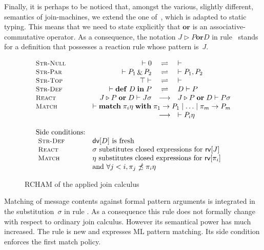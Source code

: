 \documentclass{LMCS}
\newcommand{\pt}{\pi}
\newcommand{\rln}[1]{\text{\small\sc #1}}
\newcommand{\kwd}[1]{\ensuremath{\mathbf{#1}}}
\newcommand{\prefix}[1]{\mathopen{}\mathrel{\kwd {#1}}}
\newcommand{\infix}[1]{\mathrel{\kwd {#1}}}
\renewcommand{\_}{\mathord{\rule[-.25ex]{1ex}{.15ex}}}
\newcommand{\nullp}{0}
\newcommand{\para}[2]{#1\mathop{\&}#2}
\newcommand{\dis}[2]{#1\infix{or}#2}
\newcommand{\define}[2]{\prefix{def} #1 \infix{in} #2}
\newcommand{\matchfour}[4]{\prefix{match}  #1 \infix{with} #2_1
  \rightarrow #3_1 \mid \ldots \mid #2_{#4} \rightarrow #3_{#4}}
\newcommand{\reaction}[2]{#1 \triangleright #2}
\newcommand{\soup}[2]{#1\vdash#2}
\newcommand{\reduces}{\longrightarrow}
\newcommand{\hc}{\rightleftharpoons}
\newcommand{\dv}[1]{\mbox{\sf dv}[#1]}
\newcommand{\rv}[1]{\mbox{\sf rv}[#1]}
\begin{document}
Finally, it is perhaps to be noticed that, amongst the various,
slightly different, semantics of join-machines, we extend the one
of~\cite{Fournet-Laneve-Maranget-Remy:typing-join}, which is adapted
to static typing.  This means that we need to state explicitly that
$\kwd{or}$ is an associative-commutative operator.  As a consequence,
the notation $\dis{\reaction{J}{P}}{D}$ in rule~\rln{React} stands for
a definition that possesses a reaction rule whose pattern is~$J$.
\begin{figure}
\centering
$$
\begin{array}{lcrcl}
  \rln{Str-Null} && \soup{}{\nullp} & \hc & \soup{}{} \\
  \rln{Str-Par} && \soup{}{\para{P_1}{P_2}} & \hc & 
  \soup{}{P_1,P_2} \\
  \rln{Str-Top} && \soup{\top}{} & \hc & \soup{}{}\\
  \rln{Str-Def} && \soup{}{\define{D}{P}} & \hc & \soup{D}{P} \\
  \rln{React} && \soup{\dis{\reaction{J}{P}}{D}}{J\sigma}
  & \reduces & \soup{\dis{\reaction{J}{P}}{D}}{P\sigma}\\
  \rln{Match} &
  \multicolumn{4}{l}{\soup{}{\matchfour{\pt_i\eta}{\pt}{P}{m}}} \\
  &&& \reduces & \soup{}{P_i\eta}\\\\
  \mbox{Side conditions:}\\
  \ \rln{Str-Def}& \multicolumn{4}{l}{\mbox{$\dv{D}$ is fresh}}\\
  \ \rln{React}& 
  \multicolumn{4}{l}{\mbox{$\sigma$ substitutes closed expressions for $\rv{J}$}}\\
  \ \rln{Match}& 
  \multicolumn{4}{l}
  {\mbox{$\eta$ substitutes closed expressions for $\rv{\pt_i}$}}\\
  & \multicolumn{4}{l}{\mbox{and $\forall
      j < i, \pt_j \npreceq \pt_i\eta$}}\\
\end{array}
$$
\caption{RCHAM of the applied join calculus}\label{fig.cham}
\end{figure}

Matching of message contents against formal pattern arguments
is integrated in the substitution~$\sigma$ in rule \rln{React}.
As a consequence  this rule does not formally change
with respect to ordinary join calculus. However its semantical power has
much increased.
The \rln{Match} rule is new and expresses ML pattern matching.  
Its side condition enforces the first match policy.
\end{document}
